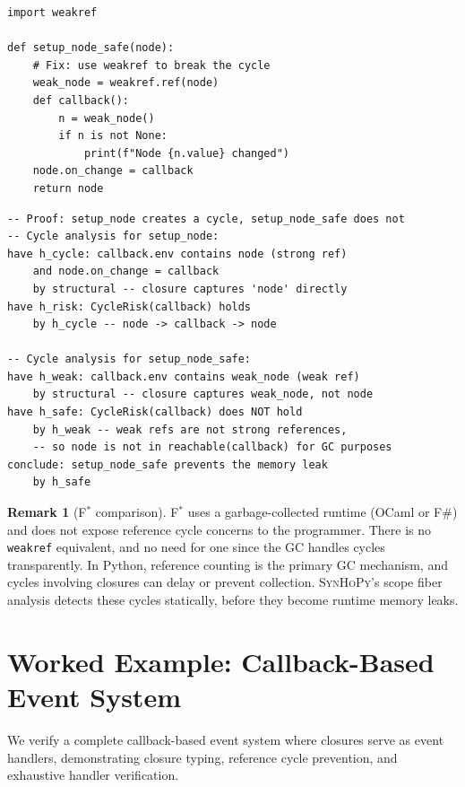 \documentclass[11pt,a4paper]{report}
\theoremstyle{definition}
\newtheorem{remark}[definition]{Remark}
\theoremstyle{plain}
\newcommand{\fstar}{F$^{*}$}
\newcommand{\synhopy}{\textsc{SynHoPy}}
\begin{document}
\begin{lstlisting}[style=python]
import weakref

def setup_node_safe(node):
    # Fix: use weakref to break the cycle
    weak_node = weakref.ref(node)
    def callback():
        n = weak_node()
        if n is not None:
            print(f"Node {n.value} changed")
    node.on_change = callback
    return node
\end{lstlisting}

\begin{lstlisting}[style=proof]
-- Proof: setup_node creates a cycle, setup_node_safe does not
-- Cycle analysis for setup_node:
have h_cycle: callback.env contains node (strong ref)
    and node.on_change = callback
    by structural -- closure captures 'node' directly
have h_risk: CycleRisk(callback) holds
    by h_cycle -- node -> callback -> node

-- Cycle analysis for setup_node_safe:
have h_weak: callback.env contains weak_node (weak ref)
    by structural -- closure captures weak_node, not node
have h_safe: CycleRisk(callback) does NOT hold
    by h_weak -- weak refs are not strong references,
    -- so node is not in reachable(callback) for GC purposes
conclude: setup_node_safe prevents the memory leak
    by h_safe
\end{lstlisting}

\begin{remark}[\fstar{} comparison]
\fstar{} uses a garbage-collected runtime (OCaml or F\#) and does not
expose reference cycle concerns to the programmer.  There is no
\texttt{weakref} equivalent, and no need for one since the GC handles
cycles transparently.  In Python, reference counting is the primary GC
mechanism, and cycles involving closures can delay or prevent collection.
\synhopy{}'s scope fiber analysis detects these cycles statically,
before they become runtime memory leaks.
\end{remark}

\section{Worked Example: Callback-Based Event System}

We verify a complete callback-based event system where closures serve as
event handlers, demonstrating closure typing, reference cycle prevention,
and exhaustive handler verification.
\end{document}
